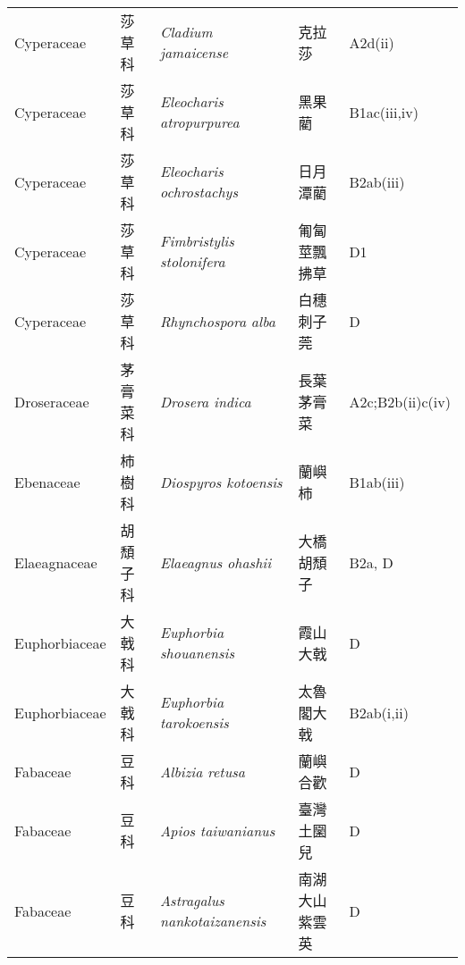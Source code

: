 {\begin{longtable}{p{2.5cm}p{2.5cm}p{4.5cm}p{2.5cm}p{3cm}}
    Cyperaceae & 莎草科 & \textit{Cladium jamaicense}  & 克拉莎 & A2d(ii) \index{Cladium@\textit{Cladium}!jamaicense@\textit{jamaicense}}  \index{克拉莎} \\
    Cyperaceae & 莎草科 & \textit{Eleocharis atropurpurea}  & 黑果藺 & B1ac(iii,iv) \index{Eleocharis@\textit{Eleocharis}!atropurpurea@\textit{atropurpurea}}  \index{黑果藺} \\
    Cyperaceae & 莎草科 & \textit{Eleocharis ochrostachys}  & 日月潭藺 & B2ab(iii) \index{Eleocharis@\textit{Eleocharis}!ochrostachys@\textit{ochrostachys}}  \index{日月潭藺} \\
    Cyperaceae & 莎草科 & \textit{Fimbristylis stolonifera}  & 匍匐莖飄拂草 & D1 \index{Fimbristylis@\textit{Fimbristylis}!stolonifera@\textit{stolonifera}}  \index{匍匐莖飄拂草} \\
    Cyperaceae & 莎草科 & \textit{Rhynchospora alba}  & 白穗刺子莞 & D \index{Rhynchospora@\textit{Rhynchospora}!alba@\textit{alba}}  \index{白穗刺子莞} \\
    Droseraceae & 茅膏菜科 & \textit{Drosera indica}  & 長葉茅膏菜 & A2c;B2b(ii)c(iv) \index{Drosera@\textit{Drosera}!indica@\textit{indica}}  \index{長葉茅膏菜} \\
    Ebenaceae & 柿樹科 & \textit{Diospyros kotoensis}  & 蘭嶼柿 & B1ab(iii) \index{Diospyros@\textit{Diospyros}!kotoensis@\textit{kotoensis}}  \index{蘭嶼柿} \\
    Elaeagnaceae & 胡頹子科 & \textit{Elaeagnus ohashii}  & 大橋胡頹子 & B2a, D \index{Elaeagnus@\textit{Elaeagnus}!ohashii@\textit{ohashii}}  \index{大橋胡頹子} \\
    Euphorbiaceae & 大戟科 & \textit{Euphorbia shouanensis}  & 霞山大戟 & D \index{Euphorbia@\textit{Euphorbia}!shouanensis@\textit{shouanensis}}  \index{霞山大戟} \\
    Euphorbiaceae & 大戟科 & \textit{Euphorbia tarokoensis}  & 太魯閣大戟 & B2ab(i,ii) \index{Euphorbia@\textit{Euphorbia}!tarokoensis@\textit{tarokoensis}}  \index{太魯閣大戟} \\
    Fabaceae & 豆科 & \textit{Albizia retusa}  & 蘭嶼合歡 & D \index{Albizia@\textit{Albizia}!retusa@\textit{retusa}}  \index{蘭嶼合歡} \\
    Fabaceae & 豆科 & \textit{Apios taiwanianus}  & 臺灣土圞兒 & D \index{Apios@\textit{Apios}!taiwanianus@\textit{taiwanianus}}  \index{臺灣土圞兒} \\
    Fabaceae & 豆科 & \textit{Astragalus nankotaizanensis}  & 南湖大山紫雲英 & D \index{Astragalus@\textit{Astragalus}!nankotaizanensis@\textit{nankotaizanensis}}  \index{南湖大山紫雲英} \\

\end{longtable}}

